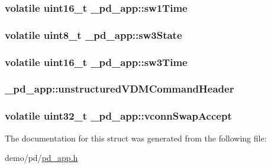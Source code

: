 \hypertarget{struct__pd__app_a494ab24cc582fc7368f16a047a21a9fe}{
\subsubsection[{sw1\-Time}]{\setlength{\rightskip}{0pt plus 5cm}volatile uint16\-\_\-t \-\_\-pd\-\_\-app\-::sw1\-Time}}\label{struct__pd__app_a494ab24cc582fc7368f16a047a21a9fe}
\hypertarget{struct__pd__app_a43c11ce854eb3293efaf0f274421a675}{
\subsubsection[{sw3\-State}]{\setlength{\rightskip}{0pt plus 5cm}volatile uint8\-\_\-t \-\_\-pd\-\_\-app\-::sw3\-State}}\label{struct__pd__app_a43c11ce854eb3293efaf0f274421a675}
\hypertarget{struct__pd__app_a61108d939110e1c95e4dd8cb001a5559}{
\subsubsection[{sw3\-Time}]{\setlength{\rightskip}{0pt plus 5cm}volatile uint16\-\_\-t \-\_\-pd\-\_\-app\-::sw3\-Time}}\label{struct__pd__app_a61108d939110e1c95e4dd8cb001a5559}
\hypertarget{struct__pd__app_a32b118d435397c3f4bbe690c4e30d354}{
\subsubsection[{unstructured\-V\-D\-M\-Command\-Header}]{ \-\_\-pd\-\_\-app\-::unstructured\-V\-D\-M\-Command\-Header}}\label{struct__pd__app_a32b118d435397c3f4bbe690c4e30d354}
\hypertarget{struct__pd__app_ad3460ca1eda49e355b0b155671ba2823}{
\subsubsection[{vconn\-Swap\-Accept}]{\setlength{\rightskip}{0pt plus 5cm}volatile uint32\-\_\-t \-\_\-pd\-\_\-app\-::vconn\-Swap\-Accept}}\label{struct__pd__app_ad3460ca1eda49e355b0b155671ba2823}


The documentation for this struct was generated from the following file\-:\begin{DoxyCompactItemize}
\item 
demo/pd/\hyperlink{pd__app_8h}{pd\-\_\-app.\-h}\end{DoxyCompactItemize}
